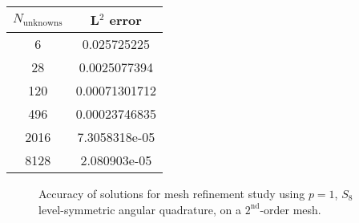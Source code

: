 \documentclass[12pt]{article}
\begin{document}
\begin{table}[!htb]
\centering
{\renewcommand{\arraystretch}{1.5}
\begin{tabular}{|c|c|}
\hline
$N_\text{unknowns}$ & L$^2$ error \\\hline
6 & 0.025725225 \\\hline
28 & 0.0025077394 \\\hline
120 & 0.00071301712 \\\hline
496 & 0.00023746835 \\\hline
2016 & 7.3058318e-05 \\\hline
8128 & 2.080903e-05 \\\hline
\end{tabular}}
\end{table}

\begin{figure}[!htb]
\centering
{}
\caption{Accuracy of solutions for mesh refinement study using $p=1$, $S_8$ level-symmetric angular quadrature, on a $2^\text{nd}$-order mesh.}
\label{fig:RZASMMSLinearRhoBrunnerp1S8g2Accuracy}
\end{figure}

\FloatBarrier
\end{document}

